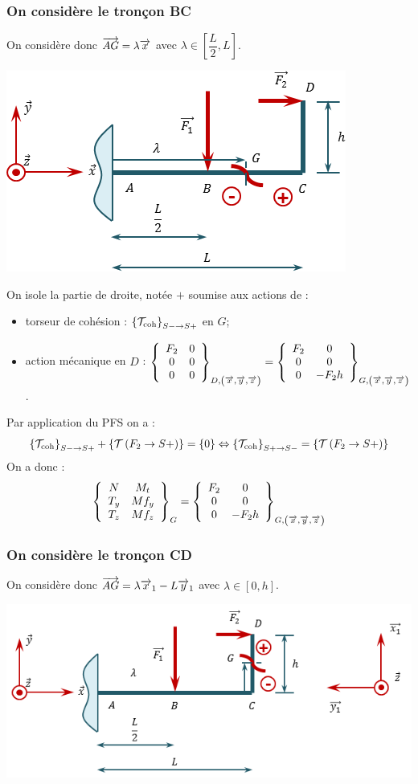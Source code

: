 \documentclass[10pt,fleqn]{article} %
\begin{document}
\begin{multicols}{1}
\begin{corrige}
\subsubsection*{On considère le tronçon BC}
On considère donc $\vect{AG} = \lambda \vect{x}$ avec $\lambda\in \left[\dfrac{L}{2},L\right]$.
\begin{center}
\includegraphics[width=.45\textwidth]{images/exo_08_corr_02}
\end{center}


On isole la partie de droite, notée $+$ soumise aux actions de :
\begin{itemize}[label=,font=\color{ocre}] 
\item torseur de cohésion : $\torseurscoh_{S-\rightarrow S+}$ en $G$;
\item action mécanique en $D$ : $\torseurcol{F_2}{0}{0}{0}{0}{0}{D,\left( \vect{x},\vect{y},\vect{z} \right)}  =\torseurcol{F_2}{0}{0}{0}{0}{-F_2h}{G,\left( \vect{x},\vect{y},\vect{z} \right)} $.
\end{itemize}


Par application du PFS on a : 
$$ \torseurscoh_{S-\rightarrow S+} +\torseurstat{T}{F_2}{S+} = \{0\} \Leftrightarrow \torseurscoh_{S+\rightarrow S-} =\torseurstat{T}{F_2}{S+}  $$
On a donc  :
$$
\torseurcol{N}{T_y}{T_z}{M_t}{Mf_y}{Mf_z}{G} = 
\torseurcol{F_2}{0}{0}{0}{0}{-F_2h}{G,\left( \vect{x},\vect{y},\vect{z} \right)}
$$
\subsubsection*{On considère le tronçon CD}
On considère donc $\vect{AG} = \lambda \vect{x}_1-L \vect{y}_1$  avec $\lambda\in \left[0,h\right]$.
\begin{center}
\includegraphics[width=.45\textwidth]{images/exo_08_corr_03}
\end{center}



\end{corrige}
\end{multicols}
\end{document}
